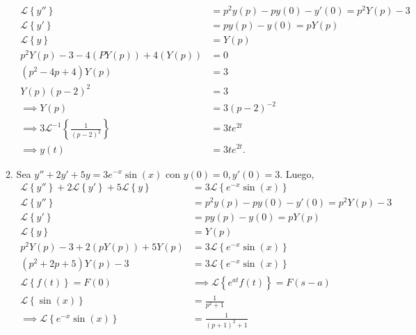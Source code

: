 \documentclass[12pt]{exam}
\newcommand{\Laplace}{\mathscr{L}}
\begin{document}
\begin{enumerate}
\begin{enumerate}
\begin{align*}
		\mathscr{L}\left\{ y'' \right\} &= p^2y\left( p \right) - py\left( 0 \right) - y'\left( 0 \right) = p^2Y\left( p \right) - 3 \\
		\mathscr{L}\left\{ y' \right\} &= py\left( p \right) - y\left( 0 \right) = pY\left( p \right) \\
		\mathscr{L}\left\{ y \right\} &= Y\left( p \right) \\
		p^2Y\left( p \right) - 3 - 4\left( PY\left( p \right)  \right) + 4\left( Y\left( p \right)  \right) &= 0 \\
		\left( p^2 - 4p + 4 \right) Y\left( p \right) &= 3\\
		Y\left( p \right) \left( p - 2 \right)^2 &= 3\\
		\implies Y\left( p \right) &= 3\left( p - 2 \right)^{-2}\\
		\implies 3\mathscr{L}^{-1}\left\{ \frac{1}{\left( p - 2 \right)^2} \right\} &= 3t e^{2t}\\
		\implies y\left( t \right)  &= 3te^{2t}
	      .\end{align*}
	    \item Sea $y'' + 2y' + 5y = 3e^{-x}\sin\left( x \right) $ con $y\left( 0 \right) = 0, y'\left( 0 \right) = 3$. Luego,
	      \begin{align*}
		\Laplace\left\{ y'' \right\} + 2\Laplace\left\{ y' \right\} + 5 \Laplace\left\{ y \right\} &= 3\Laplace\left\{ e^{-x}\sin\left( x \right)  \right\} \\
		\mathscr{L}\left\{ y'' \right\} &= p^2y\left( p \right) - py\left( 0 \right) - y'\left( 0 \right) = p^2Y\left( p \right) - 3 \\
		\mathscr{L}\left\{ y' \right\} &= py\left( p \right) - y\left( 0 \right) = pY\left( p \right) \\
		\mathscr{L}\left\{ y \right\} &= Y\left( p \right) \\
		p^2Y\left( p \right) - 3 + 2\left( pY\left( p \right)  \right) + 5Y\left( p \right) &= 3\Laplace\left\{ e^{-x}\sin\left( x \right)  \right\}  \\
		\left( p^2 + 2p + 5 \right) Y\left( p \right) - 3 &= 3\Laplace\left\{ e^{-x}\sin\left( x \right)  \right\} \\
		\Laplace\left\{ f\left( t \right)  \right\} = F\left( 0 \right) &\implies \Laplace\left\{ e^{at}f\left( t \right)  \right\} = F\left( s - a \right) \\
		\Laplace\left\{ \sin\left( x \right)  \right\} &= \frac{1}{p^2 + 1}\\
		\implies \Laplace\left\{ e^{-x}\sin\left( x \right)  \right\} &= \frac{1}{\left( p + 1 \right)^2 + 1} \\

\end{align*}
\end{enumerate}
\end{enumerate}
\end{document}

